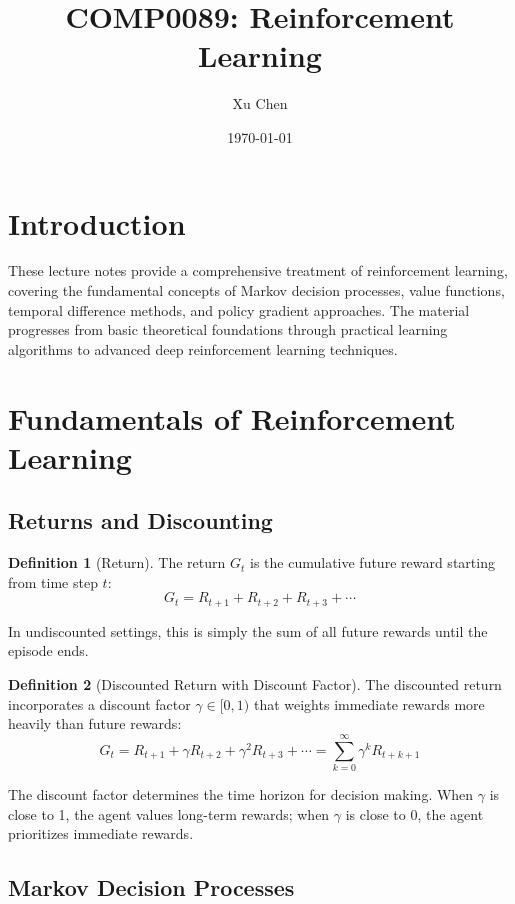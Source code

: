 \documentclass[12pt,a4paper]{article}
\title{COMP0089: Reinforcement Learning}
\author{Xu Chen}
\date{\today}
\theoremstyle{definition}
\newtheorem{definition}{Definition}[section]
\begin{document}
\maketitle
\tableofcontents
\newpage

\section*{Introduction}

These lecture notes provide a comprehensive treatment of reinforcement learning, covering the fundamental concepts of Markov decision processes, value functions, temporal difference methods, and policy gradient approaches. The material progresses from basic theoretical foundations through practical learning algorithms to advanced deep reinforcement learning techniques.

\newpage

\section{Fundamentals of Reinforcement Learning}

\subsection{Returns and Discounting}

\begin{definition}[Return]
The return $G_t$ is the cumulative future reward starting from time step $t$:
\[
G_t = R_{t+1} + R_{t+2} + R_{t+3} + \cdots
\]

In undiscounted settings, this is simply the sum of all future rewards until the episode ends.
\end{definition}

\begin{definition}[Discounted Return with Discount Factor]
The discounted return incorporates a discount factor $\gamma \in [0, 1)$ that weights immediate rewards more heavily than future rewards:
\[
G_t = R_{t+1} + \gamma R_{t+2} + \gamma^2 R_{t+3} + \cdots = \sum_{k=0}^{\infty} \gamma^k R_{t+k+1}
\]

The discount factor determines the time horizon for decision making. When $\gamma$ is close to 1, the agent values long-term rewards; when $\gamma$ is close to 0, the agent prioritizes immediate rewards.
\end{definition}

\subsection{Markov Decision Processes}
\end{document}
